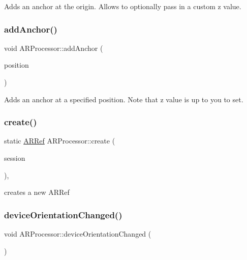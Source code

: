 Adds an anchor at the origin. Allows to optionally pass in a custom z value. 

\mbox{\label{class_a_r_processor_af4e627093ee86883736c89c2a627af42}} 
\subsubsection{\texorpdfstring{add\+Anchor()}{addAnchor()}\hspace{0.1cm}{\footnotesize\ttfamily [2/2]}}
{\footnotesize\ttfamily void A\+R\+Processor\+::add\+Anchor (\begin{DoxyParamCaption}\item[{of\+Vec3f}]{position }\end{DoxyParamCaption})}



Adds an anchor at a specified position. Note that z value is up to you to set. 

\mbox{\label{class_a_r_processor_affa1cf36e94e3015c436fd30626dd773}} 
\subsubsection{\texorpdfstring{create()}{create()}}
{\footnotesize\ttfamily static \hyperlink{_a_r_processor_8h_aa8c5643290d0692cc71388c3f0f1623a}{A\+R\+Ref} A\+R\+Processor\+::create (\begin{DoxyParamCaption}\item[{A\+R\+Session $\ast$}]{session }\end{DoxyParamCaption})\hspace{0.3cm}{\ttfamily [inline]}, {\ttfamily [static]}}



creates a new A\+R\+Ref 

\mbox{\label{class_a_r_processor_ac065970f90243b08b9d004a4220d0345}} 
\subsubsection{\texorpdfstring{device\+Orientation\+Changed()}{deviceOrientationChanged()}}
{\footnotesize\ttfamily void A\+R\+Processor\+::device\+Orientation\+Changed (\begin{DoxyParamCaption}{ }\end{DoxyParamCaption})}

